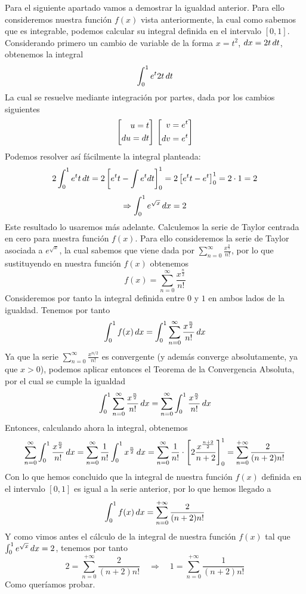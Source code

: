 \documentclass[fleqn]{article}
\def\next{\quad \Rightarrow \quad}
\begin{document}
    Para el siguiente apartado vamos a demostrar la igualdad anterior. Para ello consideremos nuestra función $f(x)$ vista anteriormente, la cual como sabemos que 
    es integrable, podemos calcular su integral definida en el intervalo $[0,1]$. Considerando primero un cambio de variable de la forma $x=t^2$, $dx = 2t \thinspace dt$,
    obtenemos la integral
    $$\int_0^1 e^t 2t \thinspace dt$$
    La cual se resuelve mediante integración por partes, dada por los cambios siguientes
    \begin{equation*}
        \left[
        \begin{aligned}
            u = t \\
            du = dt
        \end{aligned}
        \right]\\
        \left[
        \begin{aligned}
            v = e^t \\
            dv = e^t
        \end{aligned}
        \right]
    \end{equation*}
    Podemos resolver así fácilmente la integral planteada:
    $$2 \int_0^1 e^t t \thinspace dt = 2 \left[e^t t - \int e^t dt \right]_0^1 = 2 \left[e^t t - e^t \right]_0^1 = 2 \cdot 1 = 2 $$
    $$\Rightarrow \int_0^1 e^{\sqrt{x}} \thinspace dx = 2$$
    Este resultado lo usaremos más adelante. Calculemos la serie de Taylor centrada en cero para nuestra función $f(x)$. Para ello consideremos la serie de Taylor 
    asociada a $e^{\sqrt{x}}$, la cual sabemos que viene dada por $\sum_{n=0}^{\infty} \frac{x^{\frac{n}{2}}}{n!}$, por lo que sustituyendo en nuestra función $f(x)$ obtenemos
    $$f(x) = \sum_{n=0}^{\infty} \frac{x^{\frac{n}{2}}}{n!}$$
    Consideremos por tanto la integral definida entre $0$ y $1$ en ambos lados de la igualdad. Tenemos por tanto
    $$\int_0^1f(x) \thinspace dx = \int_0^1 \sum_{n=0}^{\infty} \frac{x^{\frac{n}{2}}}{n!} \thinspace dx$$
    Ya que la serie $\sum_{n=0}^{\infty} \frac{x^{n/2}}{n!}$ es convergente (y además converge absolutamente, ya que $x>0$), podemos aplicar entonces 
    el Teorema de la Convergencia Absoluta, por el cual se cumple la igualdad
    $$\int_0^1 \sum_{n=0}^{\infty} \frac{x^{\frac{n}{2}}}{n!} \thinspace dx = \sum_{n=0}^{\infty} \int_0^1 \frac{x^{\frac{n}{2}}}{n!} \thinspace dx$$
    Entonces, calculando ahora la integral, obtenemos
    $$\sum_{n=0}^{\infty} \int_0^1 \frac{x^{\frac{n}{2}}}{n!} \thinspace dx = \sum_{n=0}^{\infty} \frac{1}{n!} \int_0^1 x^{\frac{n}{2}} \thinspace dx = 
    \sum_{n=0}^{\infty} \frac{1}{n!} \cdot \left[2 \frac{x^{\frac{n+2}{2}}}{n+2} \right]_0^1 = \sum_{n=0}^{+\infty} \frac{2}{(n+2)n!} $$
    Con lo que hemos concluido que la integral de nuestra función $f(x)$ definida en el intervalo $[0,1]$ es igual a la serie anterior, por lo que hemos llegado a 
    $$\int_0^1 f(x) \thinspace dx = \sum_{n=0}^{+\infty} \frac{2}{(n+2)n!} $$
    Y como vimos antes el cálculo de la integral de nuestra función $f(x)$ tal que $\int_0^1 e^{\sqrt{x}} \thinspace dx = 2$, tenemos por tanto
    $$2 = \sum_{n=0}^{+\infty} \frac{2}{(n+2)n!} \next 1 = \sum_{n=0}^{+\infty} \frac{1}{(n+2)n!}$$ 
    Como queríamos probar.
   
\end{document}
